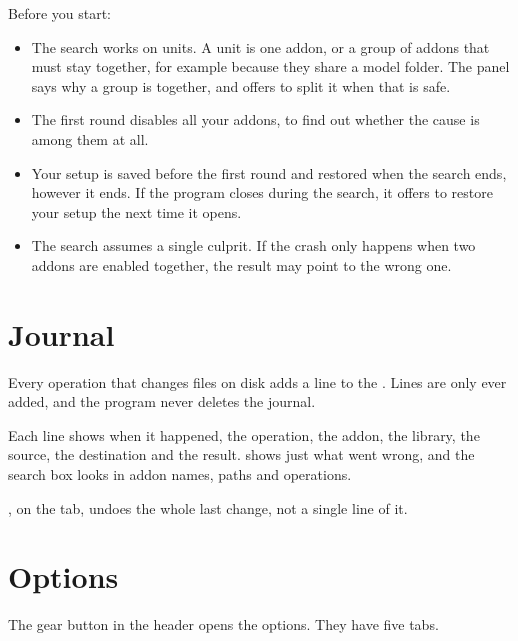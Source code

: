 \documentclass[11pt,a4paper]{article}
\begin{document}

Before you start:

\begin{itemize}
  \item The search works on units. A unit is one addon, or a group of addons
    that must stay together, for example because they share a model folder. The
    panel says why a group is together, and offers to split it when that is
    safe.
  \item The first round disables all your addons, to find out whether the cause
    is among them at all.
  \item Your setup is saved before the first round and restored when the search
    ends, however it ends. If the program closes during the search, it offers
    to restore your setup the next time it opens.
  \item The search assumes a single culprit. If the crash only happens when two
    addons are enabled together, the result may point to the wrong one.
\end{itemize}

\section{Journal}

Every operation that changes files on disk adds a line to the .
Lines are only ever added, and the program never deletes the journal.

Each line shows when it happened, the operation, the addon, the library, the
source, the destination and the result.  shows just what went
wrong, and the search box looks in addon names, paths and operations.

, on the  tab, undoes the whole last change,
not a single line of it.

\section{Options}

The gear button in the header opens the options. They have five tabs.

\end{document}
